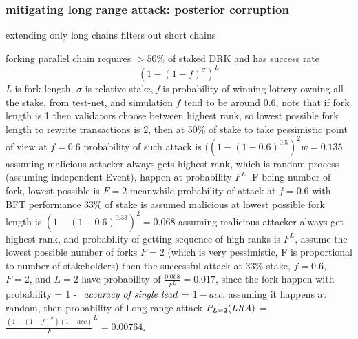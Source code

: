 \documentclass{article}
\begin{document}
\subsubsection {mitigating long range attack: posterior corruption}
\item extending only long chains filters out short chains
\item forking parallel chain requires $\gt 50\%$ of staked DRK and has success rate $$ (1-(1-f)^{\sigma})^{L} $$
  \emph{L} is fork length, $\sigma$ is relative stake, \emph{f} is probability of winning lottery owning all the stake, from test-net, and simulation $f$ tend to be around 0.6, note that if fork length is 1 then validators choose between highest rank, so lowest possible fork length to rewrite transactions is 2, then at 50\%  of stake to take pessimistic point of view at $f=0.6$ probability of such attack is $((1-(1-0.6)^{0.5})^2w=0.135$ assuming malicious attacker always gets highest rank, which is random process (assuming independent Event), happen at probability $F^L $ ,F being number of fork, lowest possible is $F=2$ meanwhile probability of attack at $f=0.6$ with BFT performance 33\% of stake is assumed malicious at lowest possible fork length is $(1-(1-0.6)^{0.33})^2=0.068$ assuming malicious attacker always get highest rank, and probability of getting sequence of high ranks is $F^L$, assume the lowest possible number of forks $F=2$ (which is very pessimistic, F is proportional to number of stakeholders) then the successful attack at $33\%$ stake, $f=0.6$, $F=2$, and $L=2$ have probability of $\frac{0.068}{F^L} = 0.017$, since the fork happen with probability = 1 - $\emph{ accuracy of single lead}$ = $1-acc$, assuming it happens at random, then probability of Long range attack $P_{L=2}(\emph{LRA})$ = $\frac{(1-(1-f)^{\sigma})(1-acc)}{F}^L = 0.00764$.
\end{document}
